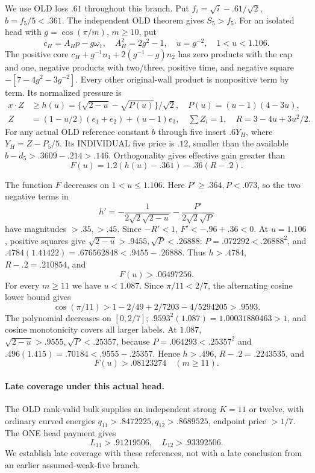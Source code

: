 \documentclass[11pt]{article}
\theoremstyle{definition}
\theoremstyle{remark}
\begin{document}
We use OLD loss \(.61\) throughout this branch.
Put \(f_i=\sqrt i-.61/\sqrt2\), \(b=f_5/5<.361\).
The independent OLD theorem gives \(S_5>f_5\).
For an isolated head with \(g=\cos(\pi/m)\), \(m\ge10\), put
\[
 c_H=A_Hp-g\omega_1,\quad A_H^2=2g^2-1,\quad
                          u=g^{-2},\quad 1<u<1.106 .
\]
The positive core \(c_H+g^{-1}n_1+2(g^{-1}-g)n_2\) has zero products
with the cap and one, negative products with two/three, positive time,
and negative square \(-[7-4g^2-3g^{-2}]\).
Every other original-wall product is nonpositive term by term.
Its normalized pressure is
\[
\begin{split}
 x\cdot Z&\ge h(u)=\{\sqrt{2-u}-\sqrt{P(u)}\}/\sqrt2,\quad
                               P(u)=(u-1)(4-3u),\\
 Z&=(1-u/2)(e_1+e_2)+(u-1)e_3,\quad\sum Z_i=1,\quad
                               R=3-4u+3u^2/2 .
\end{split}
\]
For any actual OLD reference constant \(b\) through five insert
\(.6Y_H\), where \(Y_H=Z-P_5/5\).
Its INDIVIDUAL five price is \(.12\), smaller than the available
\(b-d_5>.3609-.214>.146\).
Orthogonality gives effective gain greater than
\[
                   F(u)=1.2(h(u)-.361)-.36(R-.2).
\tag{D19largegain}\label{app:exact19:eq:Dlargegain}
\]

The function \(F\) decreases on \(1<u\le1.106\).
Here \(P'\ge.364,P<.073\), so the two negative terms in
\[
 h'=-\frac1{2\sqrt2\sqrt{2-u}}-\frac{P'}{2\sqrt2\sqrt P}
\]
have magnitudes \(>.35,>.45\).
Since \(-R'<1\), \(F'<-.96+.36<0\).
At \(u=1.106\), positive squares give
\(\sqrt{2-u}>.9455,\sqrt P<.26888\):
\(P=.072292<.26888^2\), and
\(.4784(1.41422)=.676562848<.9455-.26888\).
Thus \(h>.4784\), \(R-.2=.210854\), and
\[
                                F(u)>.06497256 .
\tag{D19largecommongain}\label{app:exact19:eq:Dlargecommongain}
\]
For every \(m\ge11\) we have \(u<1.087\).
Since \(\pi/11<2/7\), the alternating cosine lower bound gives
\[
       \cos(\pi/11)>1-2/49+2/7203-4/5294205>.9593 .
\]
The polynomial decreases on \([0,2/7]\);
\(.9593^2(1.087)=1.00031880463>1\), and cosine monotonicity covers all
larger labels.
At \(1.087\), \(\sqrt{2-u}>.9555,\sqrt P<.25357\), because
\(P=.064293<.25357^2\) and
\(.496(1.415)=.70184<.9555-.25357\).
Hence \(h>.496\), \(R-.2=.2243535\), and
\[
                           F(u)>.08123274\quad(m\ge11).
\tag{D19largerfinitegain}\label{app:exact19:eq:Dlargerfinitegain}
\]

\paragraph{Late coverage under this actual head.}
The OLD rank-valid bulk supplies an independent strong \(K=11\) or
twelve, with ordinary curved energies
\(q_{11}>.8472225,q_{12}>.8689525\), endpoint price \(>1/7\).
The ONE head payment gives
\[
                         L_{11}>.91219506,\quad L_{12}>.93392506 .
\]
We establish late coverage with these references, not with a late
conclusion from an earlier assumed-weak-five branch.
\end{document}
